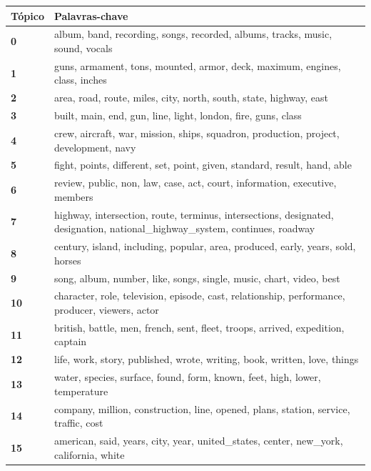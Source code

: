 \begin{table}[htpb]
    \centering
    \scriptsize
    \begin{tabularx}{\textwidth}{@{}l X@{}}
        \toprule
        \textbf{Tópico} & \textbf{Palavras-chave} \\
        \midrule
        \textbf{0} & album, band, recording, songs, recorded, albums, tracks, music, sound, vocals \\
        \textbf{1} & guns, armament, tons, mounted, armor, deck, maximum, engines, class, inches \\
        \textbf{2} & area, road, route, miles, city, north, south, state, highway, east \\
        \textbf{3} & built, main, end, gun, line, light, london, fire, guns, class \\
        \textbf{4} & crew, aircraft, war, mission, ships, squadron, production, project, development, navy \\
        \textbf{5} & fight, points, different, set, point, given, standard, result, hand, able \\
        \textbf{6} & review, public, non, law, case, act, court, information, executive, members \\
        \textbf{7} & highway, intersection, route, terminus, intersections, designated, designation, national\_highway\_system, continues, roadway \\
        \textbf{8} & century, island, including, popular, area, produced, early, years, sold, horses \\
        \textbf{9} & song, album, number, like, songs, single, music, chart, video, best \\
        \textbf{10} & character, role, television, episode, cast, relationship, performance, producer, viewers, actor \\
        \textbf{11} & british, battle, men, french, sent, fleet, troops, arrived, expedition, captain \\
        \textbf{12} & life, work, story, published, wrote, writing, book, written, love, things \\
        \textbf{13} & water, species, surface, found, form, known, feet, high, lower, temperature \\
        \textbf{14} & company, million, construction, line, opened, plans, station, service, traffic, cost \\
        \textbf{15} & american, said, years, city, year, united\_states, center, new\_york, california, white \\

\end{tabularx}
\end{table}
